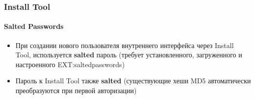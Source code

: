 \begin{frame}[fragile]
\end{frame}


\begin{frame}[fragile]
	\frametitle{Install Tool}
	\framesubtitle{Salted Passwords}

	\begin{itemize}
		\item При создании нового пользователя внутреннего интерфейса через Install Tool,
		используется \textbf{salted} пароль\newline
			(требует установленного, загруженного и настроенного EXT:saltedpasswords)
		\item Пароль к Install Tool также \textbf{salted}\newline
			(существующие хеши MD5 автоматически преобразуются при первой авторизации)
	\end{itemize}


\end{frame}
